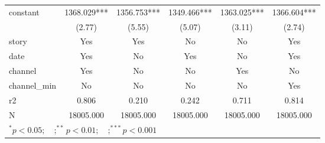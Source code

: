 \begin{tabular}{l*{5}{c}}
constant            &    1368.029***&    1356.753***&    1349.466***&    1363.025***&    1366.604***\\
                    &      (2.77)   &      (5.55)   &      (5.07)   &      (3.11)   &      (2.74)   \\
\midrule
story               &         Yes   &         Yes   &          No   &          No   &         Yes   \\
date                &         Yes   &          No   &         Yes   &          No   &         Yes   \\
channel             &         Yes   &          No   &          No   &         Yes   &          No   \\
channel\_min         &          No   &          No   &          No   &          No   &         Yes   \\
r2                  &       0.806   &       0.210   &       0.242   &       0.711   &       0.814   \\
N                   &   18005.000   &   18005.000   &   18005.000   &   18005.000   &   18005.000   \\
\bottomrule
\multicolumn{6}{l}{\footnotesize $^{*}p<0.05; \quad ; ^{**} p<0.01; \quad ; ^{***}p<0.001$}\\
\end{tabular}
